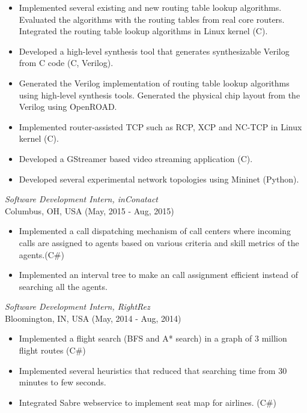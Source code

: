 \documentclass{res}
\begin{document}
\begin{resume}
   \begin{itemize} \itemsep -2pt %
  \item Implemented several existing and new routing table lookup algorithms. Evaluated the algorithms with the routing tables from real core routers. Integrated the routing table lookup algorithms in Linux kernel (C).
  \item Developed a high-level synthesis tool that generates synthesizable Verilog from C code (C, Verilog).
  \item Generated the Verilog implementation of routing table lookup algorithms using high-level synthesis tools. Generated the physical chip layout from the Verilog using OpenROAD.
  \item Implemented router-assisted TCP such as RCP, XCP and NC-TCP in Linux kernel (C).  
  \item Developed a GStreamer based video streaming application (C).
  \item Developed several experimental network topologies using Mininet (Python).	
 \end{itemize}

{\sl Software Development Intern, inConatact} \\
Columbus, OH, USA (May, 2015 - Aug, 2015)
 \begin{itemize} \itemsep -2pt
	\item Implemented a call dispatching mechanism of call centers where incoming calls are assigned to agents based on various criteria and skill metrics of the agents.(C\#)
	\item  Implemented an interval tree to make an call assignment efficient instead of searching all the agents.
  \end{itemize} \vspace{-6pt}

{\sl Software Development Intern, RightRez} \\
Bloomington, IN, USA (May, 2014 - Aug, 2014)
\begin{itemize} \itemsep -2pt
	\item  Implemented a flight search (BFS and A* search) in a graph of 3 million flight routes (C\#)
	\item  Implemented several heuristics that reduced that searching time from 30 minutes to few seconds.
    \item  Integrated Sabre webservice to implement seat map for airlines. (C\#)
\end{itemize} \vspace{-6pt}


\end{resume}
\end{document}
